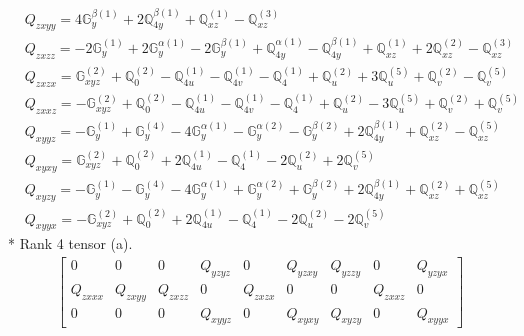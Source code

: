\documentclass[fleqn,8pt,landscape]{jsarticle}
\begin{document}
\begin{align*}
& Q_{zxyy} = 4 \mathbb{G}_{y}^{\beta(1)} + 2 \mathbb{Q}_{4y}^{\beta(1)} + \mathbb{Q}_{xz}^{(1)} - \mathbb{Q}_{xz}^{(3)} \\
& Q_{zxzz} = - 2 \mathbb{G}_{y}^{(1)} + 2 \mathbb{G}_{y}^{\alpha(1)} - 2 \mathbb{G}_{y}^{\beta(1)} + \mathbb{Q}_{4y}^{\alpha(1)} - \mathbb{Q}_{4y}^{\beta(1)} + \mathbb{Q}_{xz}^{(1)} + 2 \mathbb{Q}_{xz}^{(2)} - \mathbb{Q}_{xz}^{(3)} \\
& Q_{zxzx} = \mathbb{G}_{xyz}^{(2)} + \mathbb{Q}_{0}^{(2)} - \mathbb{Q}_{4u}^{(1)} - \mathbb{Q}_{4v}^{(1)} - \mathbb{Q}_{4}^{(1)} + \mathbb{Q}_{u}^{(2)} + 3 \mathbb{Q}_{u}^{(5)} + \mathbb{Q}_{v}^{(2)} - \mathbb{Q}_{v}^{(5)} \\
& Q_{zxxz} = - \mathbb{G}_{xyz}^{(2)} + \mathbb{Q}_{0}^{(2)} - \mathbb{Q}_{4u}^{(1)} - \mathbb{Q}_{4v}^{(1)} - \mathbb{Q}_{4}^{(1)} + \mathbb{Q}_{u}^{(2)} - 3 \mathbb{Q}_{u}^{(5)} + \mathbb{Q}_{v}^{(2)} + \mathbb{Q}_{v}^{(5)} \\
& Q_{xyyz} = - \mathbb{G}_{y}^{(1)} + \mathbb{G}_{y}^{(4)} - 4 \mathbb{G}_{y}^{\alpha(1)} - \mathbb{G}_{y}^{\alpha(2)} - \mathbb{G}_{y}^{\beta(2)} + 2 \mathbb{Q}_{4y}^{\beta(1)} + \mathbb{Q}_{xz}^{(2)} - \mathbb{Q}_{xz}^{(5)} \\
& Q_{xyxy} = \mathbb{G}_{xyz}^{(2)} + \mathbb{Q}_{0}^{(2)} + 2 \mathbb{Q}_{4u}^{(1)} - \mathbb{Q}_{4}^{(1)} - 2 \mathbb{Q}_{u}^{(2)} + 2 \mathbb{Q}_{v}^{(5)} \\
& Q_{xyzy} = - \mathbb{G}_{y}^{(1)} - \mathbb{G}_{y}^{(4)} - 4 \mathbb{G}_{y}^{\alpha(1)} + \mathbb{G}_{y}^{\alpha(2)} + \mathbb{G}_{y}^{\beta(2)} + 2 \mathbb{Q}_{4y}^{\beta(1)} + \mathbb{Q}_{xz}^{(2)} + \mathbb{Q}_{xz}^{(5)} \\
& Q_{xyyx} = - \mathbb{G}_{xyz}^{(2)} + \mathbb{Q}_{0}^{(2)} + 2 \mathbb{Q}_{4u}^{(1)} - \mathbb{Q}_{4}^{(1)} - 2 \mathbb{Q}_{u}^{(2)} - 2 \mathbb{Q}_{v}^{(5)}
\end{align*}
* Rank 4 tensor (a).
\begin{align*}
\begin{bmatrix} 0 & 0 & 0 & Q_{yzyz} & 0 & Q_{yzxy} & Q_{yzzy} & 0 & Q_{yzyx} \\ Q_{zxxx} & Q_{zxyy} & Q_{zxzz} & 0 & Q_{zxzx} & 0 & 0 & Q_{zxxz} & 0 \\ 0 & 0 & 0 & Q_{xyyz} & 0 & Q_{xyxy} & Q_{xyzy} & 0 & Q_{xyyx} \end{bmatrix}
\end{align*}
\end{document}

